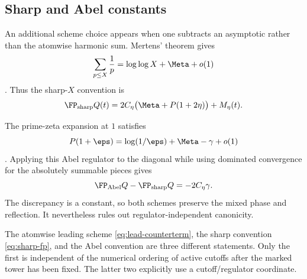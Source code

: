 \subsection{Sharp and Abel constants}

An additional scheme choice appears when one subtracts an asymptotic rather
than the atomwise harmonic sum.  Mertens' theorem gives
\begin{equation}
 \sum_{p\le X}\frac1p
 =\log\log X+\Meta+o(1)
 \label{eq:mertens}
\end{equation}
\citep{Mertens1874}.  Thus the sharp-$X$ convention is
\begin{equation}
 \FP_{\mathrm{sharp}}Q(t)
 =2C_\eta\bigl(\Meta+P(1+2\eta)\bigr)+M_\eta(t).
 \label{eq:sharp-fp}
\end{equation}

The prime-zeta expansion at $1$ satisfies
\begin{equation}
 P(1+\eps)=\log(1/\eps)+\Meta-\gamma+o(1)
 \label{eq:prime-zeta-expansion}
\end{equation}
\citep{Froberg1968}.  Applying this Abel regulator to the diagonal while
using dominated convergence for the absolutely summable pieces gives
\begin{equation}
 \FP_{\mathrm{Abel}}Q
 -\FP_{\mathrm{sharp}}Q=-2C_\eta\gamma.
 \label{eq:abel-sharp}
\end{equation}
The discrepancy is a constant, so both schemes preserve the mixed phase and
reflection.  It nevertheless rules out regulator-independent canonicity.

The atomwise leading scheme \eqref{eq:lead-counterterm}, the sharp convention
\eqref{eq:sharp-fp}, and the Abel convention are three different statements.
Only the first is independent of the numerical ordering of active cutoffs
after the marked tower has been fixed.  The latter two explicitly use a
cutoff/regulator coordinate.
